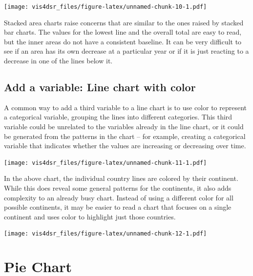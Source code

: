 \documentclass[
]{krantz}
\begin{document}
\texttt{[image: vis4dsr\_files/figure-latex/unnamed-chunk-10-1.pdf]}

Stacked area charts raise concerns that are similar to the ones raised by stacked
bar charts. The values for the lowest line and the overall total are easy to
read, but the inner areas do not have a consistent baseline. It can be very difficult
to see if an area has its own decrease at a particular year or if it is just
reacting to a decrease in one of the lines below it.

\hypertarget{add-a-variable-line-chart-with-color}{%
\subsection{Add a variable: Line chart with color}\label{add-a-variable-line-chart-with-color}}

A common way to add a third variable to a line chart is to use color to represent
a categorical variable, grouping the lines into different categories. This third
variable could be unrelated to the variables already in the line chart, or it
could be generated from the patterns in the chart -- for example, creating a
categorical variable that indicates whether the values are increasing or decreasing
over time.

\texttt{[image: vis4dsr\_files/figure-latex/unnamed-chunk-11-1.pdf]}

In the above chart, the individual country lines are colored by their continent.
While this does reveal some general patterns for the continents, it also adds
complexity to an already busy chart. Instead of using a different color
for all possible continents, it may be easier to read a chart that focuses on a
single continent and uses color to highlight just those countries.

\texttt{[image: vis4dsr\_files/figure-latex/unnamed-chunk-12-1.pdf]}

\hypertarget{pie-chart}{%
\section{Pie Chart}\label{pie-chart}}
\end{document}
